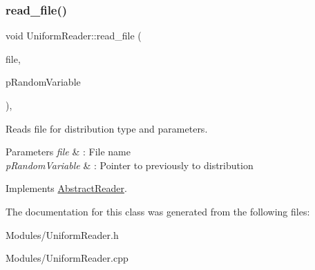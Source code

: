 \subsubsection{\texorpdfstring{read\+\_\+file()}{read\_file()}}
{\footnotesize\ttfamily void Uniform\+Reader\+::read\+\_\+file (\begin{DoxyParamCaption}\item[{const char $\ast$}]{file,  }\item[{\hyperlink{classAbstractVariable}{Abstract\+Variable} $\ast$\&}]{p\+Random\+Variable }\end{DoxyParamCaption})\hspace{0.3cm}{\ttfamily [override]}, {\ttfamily [virtual]}}



Reads file for distribution type and parameters. 


\begin{DoxyParams}{Parameters}
{\em file} & \+: File name \\
\hline
{\em p\+Random\+Variable} & \+: Pointer to previously to distribution \\
\hline
\end{DoxyParams}


Implements \hyperlink{classAbstractReader_a01d009f3633d0af6d9ea8e34defda7f5}{Abstract\+Reader}.



The documentation for this class was generated from the following files\+:\begin{DoxyCompactItemize}
\item 
Modules/Uniform\+Reader.\+h\item 
Modules/Uniform\+Reader.\+cpp\end{DoxyCompactItemize}
